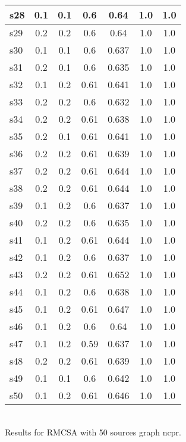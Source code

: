 \documentclass{article}
\begin{document}
\begin{tabular}{|l|c|c|c|c|c|c|}
\hline
s28 &0.1 & 0.1 & 0.6 & 0.64 & 1.0 & 1.0\\
\hline
s29 &0.2 & 0.2 & 0.6 & 0.64 & 1.0 & 1.0\\
\hline
s30 &0.1 & 0.1 & 0.6 & 0.637 & 1.0 & 1.0\\
\hline
s31 &0.2 & 0.1 & 0.6 & 0.635 & 1.0 & 1.0\\
\hline
s32 &0.1 & 0.2 & 0.61 & 0.641 & 1.0 & 1.0\\
\hline
s33 &0.2 & 0.2 & 0.6 & 0.632 & 1.0 & 1.0\\
\hline
s34 &0.2 & 0.2 & 0.61 & 0.638 & 1.0 & 1.0\\
\hline
s35 &0.2 & 0.1 & 0.61 & 0.641 & 1.0 & 1.0\\
\hline
s36 &0.2 & 0.2 & 0.61 & 0.639 & 1.0 & 1.0\\
\hline
s37 &0.2 & 0.2 & 0.61 & 0.644 & 1.0 & 1.0\\
\hline
s38 &0.2 & 0.2 & 0.61 & 0.644 & 1.0 & 1.0\\
\hline
s39 &0.1 & 0.2 & 0.6 & 0.637 & 1.0 & 1.0\\
\hline
s40 &0.2 & 0.2 & 0.6 & 0.635 & 1.0 & 1.0\\
\hline
s41 &0.1 & 0.2 & 0.61 & 0.644 & 1.0 & 1.0\\
\hline
s42 &0.1 & 0.2 & 0.6 & 0.637 & 1.0 & 1.0\\
\hline
s43 &0.2 & 0.2 & 0.61 & 0.652 & 1.0 & 1.0\\
\hline
s44 &0.1 & 0.2 & 0.6 & 0.638 & 1.0 & 1.0\\
\hline
s45 &0.1 & 0.2 & 0.61 & 0.647 & 1.0 & 1.0\\
\hline
s46 &0.1 & 0.2 & 0.6 & 0.64 & 1.0 & 1.0\\
\hline
s47 &0.1 & 0.2 & 0.59 & 0.637 & 1.0 & 1.0\\
\hline
s48 &0.2 & 0.2 & 0.61 & 0.639 & 1.0 & 1.0\\
\hline
s49 &0.1 & 0.1 & 0.6 & 0.642 & 1.0 & 1.0\\
\hline
s50 &0.1 & 0.2 & 0.61 & 0.646 & 1.0 & 1.0\\
\hline
\end{tabular}\\

\noindent Results for RMCSA with 50 sources graph ncpr.
\end{document}

